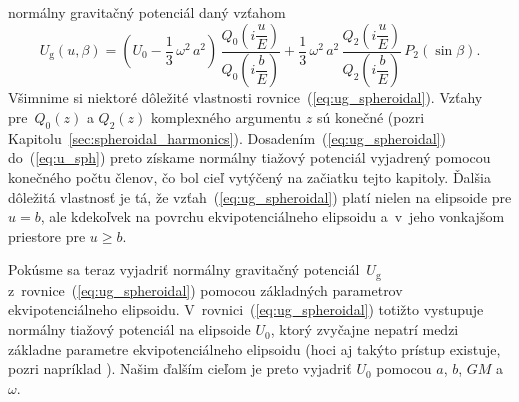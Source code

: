 \documentclass[a4paper,12pt]{book}
\newcommand{\gidx}{\mathrm g}
\begin{document}
normálny gravitačný potenciál daný vzťahom
%
\begin{equation}
\label{eq:ug_spheroidal}
U_\gidx(u, \beta) = \left( U_0 - \frac{1}{3} \, \omega^2 \, a^2 \right) \, 
\frac{Q_0\left( i \dfrac{u}{E} \right)}{Q_0\left( i \dfrac{b}{E} \right)} 
+ \frac{1}{3} \, \omega^2 \, a^2  \, \frac{Q_2\left( i \dfrac{u}{E} 
\right)}{Q_2\left( i \dfrac{b}{E} \right)} \, P_2(\sin\beta){.}
\end{equation}
%
Všimnime si niektoré dôležité vlastnosti rovnice~(\ref{eq:ug_spheroidal}).  
Vzťahy pre~$Q_0(z)$ a $Q_2(z)$ komplexného argumentu $z$ sú konečné (pozri 
Kapitolu~\ref{sec:spheroidal_harmonics}).  Dosadením~(\ref{eq:ug_spheroidal}) 
do~(\ref{eq:u_sph}) preto získame normálny tiažový potenciál vyjadrený pomocou 
konečného počtu členov, čo bol cieľ vytýčený na začiatku tejto kapitoly.  
Ďalšia dôležitá vlastnosť je tá, že vzťah~(\ref{eq:ug_spheroidal}) platí nielen 
na elipsoide pre $u = b$, ale kdekoľvek na povrchu ekvipotenciálneho elipsoidu 
a~v~jeho vonkajšom priestore pre $u \geq b$.

Pokúsme sa teraz vyjadriť normálny gravitačný potenciál~$U_\gidx$ 
z~rovnice~(\ref{eq:ug_spheroidal}) pomocou základných parametrov 
ekvipotenciálneho elipsoidu.  V~rovnici~(\ref{eq:ug_spheroidal}) totižto 
vystupuje normálny tiažový potenciál na elipsoide $U_0$, ktorý zvyčajne nepatrí 
medzi základne parametre ekvipotenciálneho elipsoidu (hoci aj takýto prístup 
existuje, pozri napríklad \cite{TorgeGeodesy}).  Našim ďalším cieľom je preto  
vyjadriť $U_0$ pomocou $a$, $b$, $GM$ a $\omega$.
\end{document}
